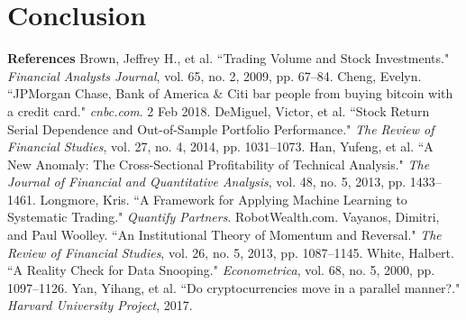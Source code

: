 \documentclass[12pt,twoside]{article}
\begin{document}
\section{Conclusion}

\newpage
{\large \textbf{References}}
\bigbreak
Brown, Jeffrey H., et al. ``Trading Volume and Stock Investments." \textit{Financial Analysts Journal}, vol. 65, no. 2, 2009, pp. 67–84.
\bigbreak
Cheng, Evelyn. ``JPMorgan Chase, Bank of America \& Citi bar people from buying bitcoin with a credit card." \textit{cnbc.com}. 2 Feb 2018.
\bigbreak
DeMiguel, Victor, et al. ``Stock Return Serial Dependence and Out-of-Sample Portfolio Performance." \textit{The Review of Financial Studies}, vol. 27, no. 4, 2014, pp. 1031–1073.
\bigbreak
Han, Yufeng, et al. ``A New Anomaly: The Cross-Sectional Profitability of Technical Analysis." \textit{The Journal of Financial and Quantitative Analysis}, vol. 48, no. 5, 2013, pp. 1433–1461.
\bigbreak
Longmore, Kris. ``A Framework for Applying Machine Learning to Systematic Trading." \textit{Quantify Partners}. RobotWealth.com.
\bigbreak
Vayanos, Dimitri, and Paul Woolley. ``An Institutional Theory of Momentum and Reversal." \textit{The Review of Financial Studies}, vol. 26, no. 5, 2013, pp. 1087–1145.
\bigbreak
White, Halbert. ``A Reality Check for Data Snooping." \textit{Econometrica}, vol. 68, no. 5, 2000, pp. 1097–1126.
\bigbreak
Yan, Yihang, et al. ``Do cryptocurrencies move in a parallel manner?." \textit{Harvard University Project}, 2017.
\bigbreak
\end{document}
